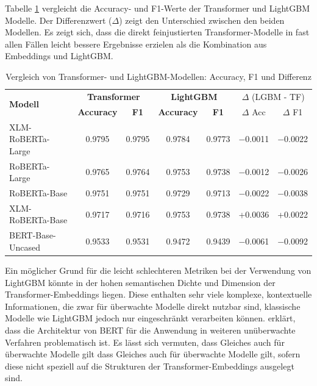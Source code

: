 Tabelle \ref{tab:transformer_vs_lightgbm} vergleicht die Accuracy- und F1-Werte der Transformer und LightGBM Modelle.
Der Differenzwert ($\Delta$) zeigt den Unterschied zwischen den beiden Modellen.
Es zeigt sich, dass die direkt feinjustierten Transformer-Modelle in fast allen Fällen leicht bessere Ergebnisse erzielen als die Kombination aus 
Embeddings und LightGBM.

\begin{table}[!ht]
\centering
\begin{tabular}{lcccccc}
    \toprule
    \multirow{2}{*}{\textbf{Modell}} &
    \multicolumn{2}{c}{\textbf{Transformer}} &
    \multicolumn{2}{c}{\textbf{LightGBM}} &
    \multicolumn{2}{c}{$\Delta$ (LGBM - TF)} \\
    \cmidrule(lr){2-3} \cmidrule(lr){4-5} \cmidrule(l){6-7}
    & \textbf{Accuracy} & \textbf{F1} & \textbf{Accuracy} & \textbf{F1} & $\Delta$ Acc & $\Delta$ F1 \\
    \midrule
    XLM-RoBERTa-Large & 0.9795 & 0.9795 & 0.9784 & 0.9773 & $-$0.0011 & $-$0.0022 \\
    RoBERTa-Large     & 0.9765 & 0.9764 & 0.9753 & 0.9738 & $-$0.0012 & $-$0.0026 \\
    RoBERTa-Base      & 0.9751 & 0.9751 & 0.9729 & 0.9713 & $-$0.0022 & $-$0.0038 \\
    XLM-RoBERTa-Base  & 0.9717 & 0.9716 & 0.9753 & 0.9738 & +0.0036 & +0.0022 \\
    BERT-Base-Uncased & 0.9533 & 0.9531 & 0.9472 & 0.9439 & $-$0.0061 & $-$0.0092 \\
    \bottomrule
\end{tabular}
\caption{Vergleich von Transformer- und LightGBM-Modellen: Accuracy, F1 und Differenz}
\label{tab:transformer_vs_lightgbm}
\end{table}

Ein möglicher Grund für die leicht schlechteren Metriken bei der Verwendung von LightGBM könnte in der hohen semantischen Dichte und Dimension der 
Transformer-Embeddings liegen. Diese enthalten sehr viele komplexe, kontextuelle Informationen, die zwar für überwachte Modelle direkt nutzbar sind, 
klassische Modelle wie LightGBM jedoch nur eingeschränkt verarbeiten können.
\cite{reimers-gurevych-2019-sentence} erklärt, dass die Architektur von BERT für die Anwendung in weiteren unüberwachte Verfahren problematisch ist.
Es lässt sich vermuten, dass Gleiches auch für überwachte Modelle gilt dass Gleiches auch für überwachte Modelle gilt, 
sofern diese nicht speziell auf die Strukturen der Transformer-Embeddings ausgelegt sind.

